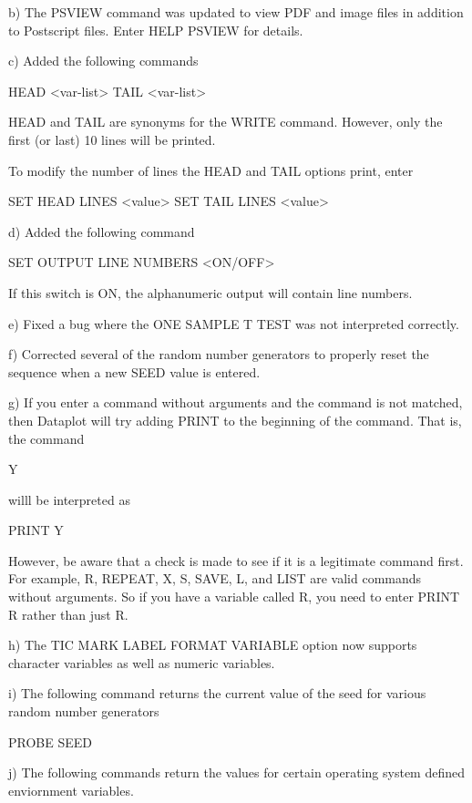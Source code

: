     b) The PSVIEW command was updated to view PDF and image files
       in addition to Postscript files.  Enter HELP PSVIEW for
       details.

    c) Added the following commands

          HEAD <var-list>
          TAIL <var-list>

       HEAD and TAIL are synonyms for the WRITE command.  However, only
       the first (or last) 10 lines will be printed.

       To modify the number of lines the HEAD and TAIL options print,
       enter

          SET HEAD LINES <value>
          SET TAIL LINES <value>

    d) Added the following command

          SET OUTPUT LINE NUMBERS <ON/OFF>

       If this switch is ON, the alphanumeric output will
       contain line numbers.

    e) Fixed a bug where the ONE SAMPLE T TEST was not
       interpreted correctly.

    f) Corrected several of the random number generators to
       properly reset the sequence when a new SEED value is
       entered.

    g) If you enter a command without arguments and the command
       is not matched, then Dataplot will try adding  PRINT to the
       beginning of the command.  That is, the command

           Y

       willl be interpreted as 

           PRINT Y

       However, be aware that a check is made to see if it is
       a legitimate command first.  For example, R, REPEAT, X,
       S, SAVE, L, and LIST are valid commands without arguments.
       So if you have a variable called R, you need to enter
       PRINT R rather than just R.

    h) The TIC MARK LABEL FORMAT VARIABLE option now supports
       character variables as well as numeric variables.

    i) The following command returns the current value of the
       seed for various random number generators

           PROBE SEED

    j) The following commands return the values for certain
       operating system defined enviornment variables.


